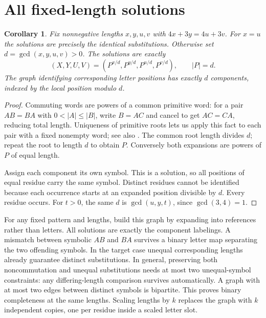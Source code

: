 \documentclass[10pt]{article}
\newtheorem{corollary}[theorem]{Corollary}
\theoremstyle{remark}\newtheorem*{remark}{Remark}
\begin{document}
\section{All fixed-length solutions}
\begin{corollary}\label{gcd}
Fix nonnegative lengths \(x,y,u,v\) with \(4x+3y=4u+3v\). For \(x=u\) the solutions are precisely the identical substitutions. Otherwise set \(d=\gcd(x,y,u,v)>0\). The solutions are exactly
\[
 (X,Y,U,V)=(P^{x/d},P^{y/d},P^{u/d},P^{v/d}),\qquad |P|=d .
\]
The graph identifying corresponding letter positions has exactly \(d\) components, indexed by the local position modulo \(d\).
\end{corollary}
\begin{proof}
Commuting words are powers of a common primitive word: for a pair \(AB=BA\) with \(0<|A|\le |B|\), write \(B=AC\) and cancel to get \(AC=CA\), reducing total length. Uniqueness of primitive roots lets us apply this fact to each pair with a fixed nonempty word; see also \cite[Lemma 1]{hs}. The common root length divides \(d\); repeat the root to length \(d\) to obtain \(P\). Conversely both expansions are powers of \(P\) of equal length.

Assign each component its own symbol. This is a solution, so all positions of equal residue carry the same symbol. Distinct residues cannot be identified because each occurrence starts at an expanded position divisible by \(d\). Every residue occurs. For \(t>0\), the same \(d\) is \(\gcd(u,y,t)\), since \(\gcd(3,4)=1\).
\end{proof}

For any fixed pattern and lengths, build this graph by expanding into references rather than letters. All solutions are exactly the component labelings. A mismatch between symbolic \(AB\) and \(BA\) survives a binary letter map separating the two offending symbols. In the target case unequal corresponding lengths already guarantee distinct substitutions. In general, preserving both noncommutation and unequal substitutions needs at most two unequal-symbol constraints: any differing-length comparison survives automatically. A graph with at most two edges between distinct symbols is bipartite. This proves binary completeness at the same lengths. Scaling lengths by \(k\) replaces the graph with \(k\) independent copies, one per residue inside a scaled letter slot.
\end{document}
